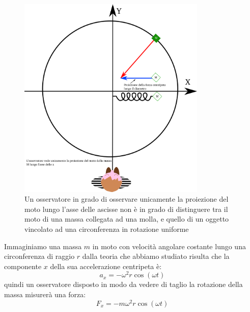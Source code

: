 \documentclass[a4paper,10pt,oneside]{article}
\begin{document}
\begin{figure}[H]
 \centering
 \includegraphics[width=0.8\textwidth]{./Immagini/armonico_vista.png}
 \caption{Un osservatore in grado di osservare unicamente la proiezione del moto lungo l'asse delle ascisse non è in grado di distinguere tra il moto di una massa collegata ad una molla, e quello di un oggetto vincolato ad una circonferenza in rotazione uniforme}\label{fig:armonico1}
\end{figure}


Immaginiamo una massa $m$ in moto con velocità angolare costante lungo una circonferenza di raggio $r$ dalla teoria che abbiamo studiato risulta che la componente $x$ della sua accelerazione centripeta è:
\begin{equation}
 a_x=-\omega^2r\cos(\omega t)
\end{equation}
quindi un osservatore disposto in modo da vedere di taglio la rotazione della massa misurerà una forza:
\begin{equation}
 F_x=-m\omega^2r\cos(\omega t)
\end{equation}
\end{document}
